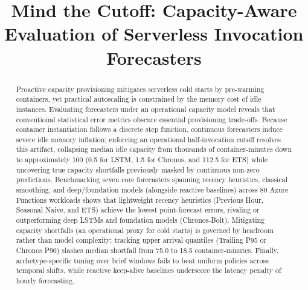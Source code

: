 \documentclass[conference,a4paper]{IEEEtran}
\begin{document}
\title{Mind the Cutoff: Capacity-Aware Evaluation of Serverless Invocation Forecasters}


\author{
\and
{}
\and
{}
}

\maketitle

\begin{abstract}
Proactive capacity provisioning mitigates serverless cold starts by pre-warming containers, yet practical autoscaling is constrained by the memory cost of idle instances. Evaluating forecasters under an operational capacity model reveals that conventional statistical error metrics obscure essential provisioning trade-offs. Because container instantiation follows a discrete step function, continuous forecasters induce severe idle memory inflation; enforcing an operational half-invocation cutoff resolves this artifact, collapsing median idle capacity from thousands of container-minutes down to approximately 100 (0.5 for LSTM, 1.5 for Chronos, and 112.5 for ETS) while uncovering true capacity shortfalls previously masked by continuous non-zero predictions. Benchmarking seven core forecasters spanning recency heuristics, classical smoothing, and deep/foundation models (alongside reactive baselines) across 80 Azure Functions workloads shows that lightweight recency heuristics (Previous Hour, Seasonal Naive, and ETS) achieve the lowest point-forecast errors, rivaling or outperforming deep LSTMs and foundation models (Chronos-Bolt). Mitigating capacity shortfalls (an operational proxy for cold starts) is governed by headroom rather than model complexity: tracking upper arrival quantiles (Trailing P95 or Chronos P90) slashes median shortfall from 75.0 to 18.5 container-minutes. Finally, archetype-specific tuning over brief windows fails to beat uniform policies across temporal shifts, while reactive keep-alive baselines underscore the latency penalty of hourly forecasting.
\end{abstract}
\end{document}
